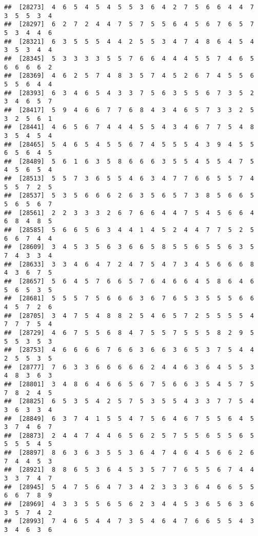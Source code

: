 \documentclass[
]{book}
\begin{document}
\begin{verbatim}
##  [28273]  4  6  5  4  5  4  5  5  3  6  4  2  7  5  6  6  4  4  7  3  5  5  3  4
##  [28297]  6  2  7  2  4  4  7  5  7  5  5  6  4  5  6  7  6  5  7  5  3  4  4  6
##  [28321]  6  3  5  5  5  4  4  2  5  5  3  4  7  4  8  6  4  5  4  3  5  3  4  4
##  [28345]  5  3  3  3  3  5  5  7  6  6  4  4  4  5  5  7  4  6  5  6  6  6  6  2
##  [28369]  4  6  2  5  7  4  8  3  5  7  4  5  2  6  7  4  5  5  6  5  5  6  4  4
##  [28393]  6  3  4  6  5  4  3  3  7  5  6  3  5  5  6  7  3  5  2  3  4  6  5  7
##  [28417]  5  9  4  6  6  7  7  6  8  4  3  4  6  5  7  3  3  2  5  3  2  5  6  1
##  [28441]  4  6  5  6  7  4  4  4  5  5  4  3  4  6  7  7  5  4  8  3  5  4  5  4
##  [28465]  5  4  6  5  4  5  5  6  7  4  5  5  5  4  3  9  4  5  5  6  5  6  4  5
##  [28489]  5  6  1  6  3  5  8  6  6  6  3  5  5  4  5  5  4  7  5  4  5  6  5  4
##  [28513]  5  5  7  3  6  5  5  4  6  3  4  7  7  6  6  5  5  7  4  5  5  7  2  5
##  [28537]  5  3  5  6  6  6  2  6  3  5  6  5  7  3  8  5  6  6  5  5  6  5  6  7
##  [28561]  2  2  3  3  3  2  6  7  6  6  4  4  7  5  4  5  6  6  4  6  8  4  8  5
##  [28585]  5  6  6  5  6  3  4  4  1  4  5  2  4  4  7  7  5  2  5  6  6  7  4  4
##  [28609]  3  4  5  3  5  6  3  6  6  5  8  5  5  6  5  5  6  3  5  7  4  3  3  4
##  [28633]  3  3  4  6  4  7  2  4  7  5  4  7  3  4  5  6  6  6  8  4  3  6  7  5
##  [28657]  5  6  4  5  7  6  6  5  7  6  4  6  6  4  5  8  6  4  6  5  6  5  3  5
##  [28681]  5  5  5  7  5  6  6  6  3  6  7  6  5  3  5  5  5  6  6  4  5  7  2  6
##  [28705]  3  4  7  5  4  8  8  2  5  4  6  5  7  2  5  5  5  5  4  7  7  7  5  4
##  [28729]  4  6  7  5  5  6  8  4  7  5  5  7  5  5  5  8  2  9  5  5  5  3  5  3
##  [28753]  4  6  6  6  6  7  6  6  3  6  6  3  6  5  3  7  5  4  4  2  5  5  3  5
##  [28777]  7  6  3  3  6  6  6  6  6  2  4  4  6  3  6  4  5  5  3  4  8  3  6  3
##  [28801]  3  4  8  6  4  6  6  5  6  7  5  6  6  3  5  4  5  7  5  7  8  2  4  5
##  [28825]  6  5  3  5  4  2  5  7  5  3  5  5  4  3  3  7  7  5  4  3  6  3  3  4
##  [28849]  6  3  7  4  1  5  5  4  7  5  6  4  6  7  5  5  6  4  5  3  7  4  6  7
##  [28873]  2  4  4  7  4  4  6  5  6  2  5  7  5  5  6  5  5  6  5  5  5  5  4  5
##  [28897]  8  6  3  6  3  5  5  3  6  4  7  4  6  4  5  6  6  2  6  7  4  4  5  3
##  [28921]  8  8  6  5  3  6  4  5  3  5  7  7  6  5  5  6  7  4  4  3  3  7  4  7
##  [28945]  5  4  7  5  6  4  7  3  4  2  3  3  3  6  4  6  6  5  5  6  6  7  8  9
##  [28969]  4  3  3  5  5  6  5  6  2  3  4  4  5  3  6  5  6  3  6  3  5  7  4  2
##  [28993]  7  4  6  5  4  4  7  3  5  4  6  4  7  6  6  5  5  4  3  3  4  6  3  6

\end{verbatim}
\end{document}
